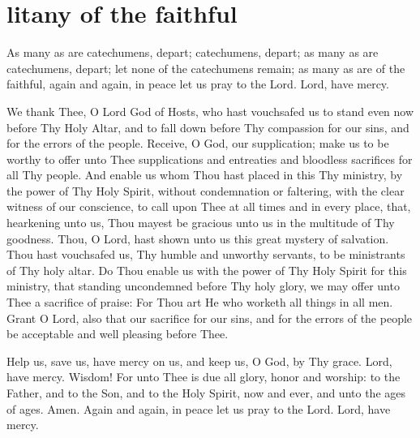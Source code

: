 \section{litany of the faithful}

\begin{liturgicaltext}
    \deacon As many as are catechumens, depart; catechumens, depart; as many as are catechumens, depart; let none of the catechumens remain; as many as are of the faithful, again and again, in peace let us pray to the Lord.
    \choirsemisecret Lord, have mercy. 
\end{liturgicaltext}
\begin{semisecret}
    \begin{secretprayerbasil}
        We thank Thee, O Lord God of Hosts, who hast vouchsafed us to stand even now before Thy Holy Altar, and to fall down before Thy compassion for our sins, and for the errors of the people. Receive, O God, our supplication; make us to be worthy to offer unto Thee supplications and entreaties and bloodless sacrifices for all Thy people. And enable us whom Thou hast placed in this Thy ministry, by the power of Thy Holy Spirit, without condemnation or faltering, with the clear witness of our conscience, to call upon Thee at all times and in every place, that, hearkening unto us, Thou mayest be gracious unto us in the multitude of Thy goodness.
        \switchcolumn
        Thou, O Lord, hast shown unto us this great mystery of salvation. Thou hast vouchsafed us, Thy humble and unworthy servants, to be ministrants of Thy holy altar. Do Thou enable us with the power of Thy Holy Spirit for this ministry, that standing uncondemned before Thy holy glory, we may offer unto Thee a sacrifice of praise: For Thou art He who worketh all things in all men. Grant O Lord, also that our sacrifice for our sins, and for the errors of the people be acceptable and well pleasing before Thee.
    \end{secretprayerbasil}
\end{semisecret}
\begin{liturgicaltext}
    \deacon Help us, save us, have mercy on us, and keep us, O God, by Thy grace.
    \choir Lord, have mercy.
    \deacon Wisdom!
    \priest For unto Thee is due all glory, honor and worship: to the Father, and to the Son, and to the Holy Spirit, now and ever, and unto the ages of ages.
    \choir Amen.
    \deacon Again and again, in peace let us pray to the Lord.
    \choirsemisecret Lord, have mercy. 
\end{liturgicaltext}
